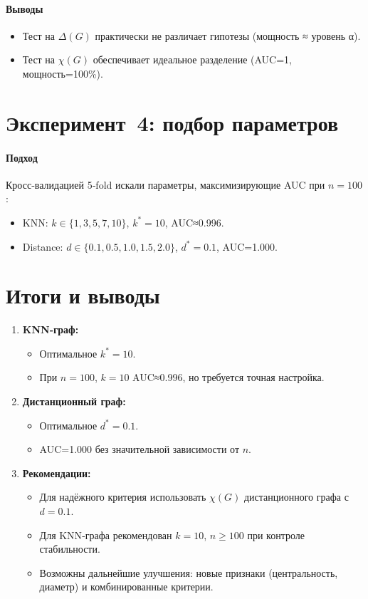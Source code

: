\documentclass[12pt,a4paper]{article}
\begin{document}
\paragraph{Выводы}
\begin{itemize}
  \item Тест на $\Delta(G)$ практически не различает гипотезы (мощность ≈ уровень α).
  \item Тест на $\chi(G)$ обеспечивает идеальное разделение (AUC=1, мощность=100\%).
\end{itemize}

\section{Эксперимент 4: подбор параметров}
\paragraph{Подход}
Кросс‑валидацией 5‑fold искали параметры, максимизирующие AUC при $n=100$:
\begin{itemize}
  \item KNN: $k\in\{1,3,5,7,10\}$, $k^*=10$, AUC≈0.996.
  \item Distance: $d\in\{0.1,0.5,1.0,1.5,2.0\}$, $d^*=0.1$, AUC=1.000.
\end{itemize}

\section*{Итоги и выводы}
\begin{enumerate}
  \item \textbf{KNN‑граф:}
    \begin{itemize}
      \item Оптимальное $k^*=10$.
      \item При $n=100$, $k=10$ AUC≈0.996, но требуется точная настройка.
    \end{itemize}
  \item \textbf{Дистанционный граф:}
    \begin{itemize}
      \item Оптимальное $d^*=0.1$.
      \item AUC=1.000 без значительной зависимости от $n$.
    \end{itemize}
  \item \textbf{Рекомендации:}
    \begin{itemize}
      \item Для надёжного критерия использовать $\chi(G)$ дистанционного графа с $d=0.1$.
      \item Для KNN‑графа рекомендован $k=10$, $n\ge100$ при контроле стабильности.
      \item Возможны дальнейшие улучшения: новые признаки (центральность, диаметр) и комбинированные критерии.
    \end{itemize}
\end{enumerate}
\end{document}
